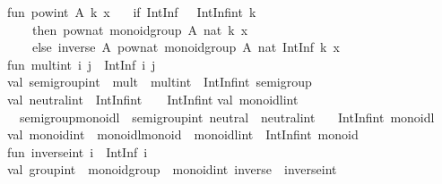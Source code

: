 \begin{isabellebody}
\begin{isamarkuptext}
\isanewline
fun\ pow{\isacharunderscore}int\ A{\isacharunderscore}\ k\ x\ {\isacharequal}\isanewline
\ \ {\isacharparenleft}if\ IntInf{\isachardot}{\isacharless}{\isacharequal}\ {\isacharparenleft}{\isacharparenleft}{}\ {\isacharcolon}\ IntInf{\isachardot}int{\isacharparenright}{\isacharcomma}\ k{\isacharparenright}\isanewline
\ \ \ \ then\ pow{\isacharunderscore}nat\ {\isacharparenleft}monoid{\isacharunderscore}group\ A{\isacharunderscore}{\isacharparenright}\ {\isacharparenleft}nat\ k{\isacharparenright}\ x\isanewline
\ \ \ \ else\ inverse\ A{\isacharunderscore}\ {\isacharparenleft}pow{\isacharunderscore}nat\ {\isacharparenleft}monoid{\isacharunderscore}group\ A{\isacharunderscore}{\isacharparenright}\ {\isacharparenleft}nat\ {\isacharparenleft}IntInf{\isachardot}{\isachartilde}\ k{\isacharparenright}{\isacharparenright}\ x{\isacharparenright}{\isacharparenright}{\isacharsemicolon}\isanewline
\isanewline
fun\ mult{\isacharunderscore}int\ i\ j\ {\isacharequal}\ IntInf{\isachardot}{\isacharplus}\ {\isacharparenleft}i{\isacharcomma}\ j{\isacharparenright}{\isacharsemicolon}\isanewline
\isanewline
val\ semigroup{\isacharunderscore}int\ {\isacharequal}\ {\isacharbraceleft}mult\ {\isacharequal}\ mult{\isacharunderscore}int{\isacharbraceright}\ {\isacharcolon}\ IntInf{\isachardot}int\ semigroup{\isacharsemicolon}\isanewline
\isanewline
val\ neutral{\isacharunderscore}int\ {\isacharcolon}\ IntInf{\isachardot}int\ {\isacharequal}\ {\isacharparenleft}{}\ {\isacharcolon}\ IntInf{\isachardot}int{\isacharparenright}{\isacharsemicolon}\isanewline
\isanewline
val\ monoidl{\isacharunderscore}int\ {\isacharequal}\isanewline
\ \ {\isacharbraceleft}semigroup{\isacharunderscore}monoidl\ {\isacharequal}\ semigroup{\isacharunderscore}int{\isacharcomma}\ neutral\ {\isacharequal}\ neutral{\isacharunderscore}int{\isacharbraceright}\ {\isacharcolon}\isanewline
\ \ IntInf{\isachardot}int\ monoidl{\isacharsemicolon}\isanewline
\isanewline
val\ monoid{\isacharunderscore}int\ {\isacharequal}\ {\isacharbraceleft}monoidl{\isacharunderscore}monoid\ {\isacharequal}\ monoidl{\isacharunderscore}int{\isacharbraceright}\ {\isacharcolon}\ IntInf{\isachardot}int\ monoid{\isacharsemicolon}\isanewline
\isanewline
fun\ inverse{\isacharunderscore}int\ i\ {\isacharequal}\ IntInf{\isachardot}{\isachartilde}\ i{\isacharsemicolon}\isanewline
\isanewline
val\ group{\isacharunderscore}int\ {\isacharequal}\ {\isacharbraceleft}monoid{\isacharunderscore}group\ {\isacharequal}\ monoid{\isacharunderscore}int{\isacharcomma}\ inverse\ {\isacharequal}\ inverse{\isacharunderscore}int{\isacharbraceright}\ {\isacharcolon}\isanewline

\end{isamarkuptext}
\end{isabellebody}
